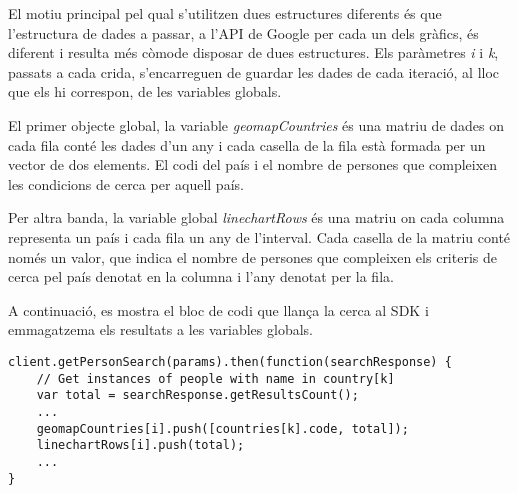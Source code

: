 El motiu principal pel qual s’utilitzen dues estructures diferents és que l'estructura de dades a passar, a l’API de Google per cada un dels gràfics, és diferent i resulta més còmode disposar de dues estructures. Els paràmetres \emph{i} i \emph{k}, passats a cada crida, s’encarreguen de guardar les dades de cada iteració, al lloc que els hi correspon, de les variables globals.

El primer objecte global, la variable \emph{geomapCountries} és una matriu de dades on cada fila conté les dades d'un any i cada casella de la fila està formada per un vector de dos elements. El codi del país i el nombre de persones que compleixen les condicions de cerca per aquell país.

Per altra banda, la variable global \emph{linechartRows} és una matriu on cada columna representa un país i cada fila un any de l'interval. Cada casella de la matriu conté només un valor, que indica el nombre de persones que compleixen els criteris de cerca pel país denotat en la columna i l’any denotat per la fila.

A continuació, es mostra el bloc de codi que llança la cerca al SDK i  emmagatzema els resultats a les variables globals.

\begin{lstlisting}[style=rawOwn,caption={Crida al SDK i actualització de variables globals}]
client.getPersonSearch(params).then(function(searchResponse) {
    // Get instances of people with name in country[k]
    var total = searchResponse.getResultsCount();
    ...
    geomapCountries[i].push([countries[k].code, total]);
    linechartRows[i].push(total);
    ...
}
\end{lstlisting}
